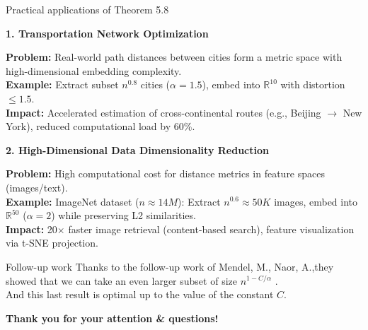 \documentclass[xcolor=dvipsnames]{beamer}
\theoremstyle{remark}
\def \cbf {\color{blue}\bf}
\begin{document}
   \begin{frame}{Practical applications of Theorem 5.8}
    \vspace{-0.2cm}
    
    \textbf{\large 1. Transportation Network Optimization}  
    \vspace{0.1cm}
    
    \textbf{Problem:} Real-world path distances between cities form a metric space with high-dimensional embedding complexity.\\
    \textbf{Example:} Extract subset \( n^{0.8} \) cities (\( \alpha=1.5 \)), embed into \( \mathbb{R}^{10} \) with distortion \( \leq 1.5 \).\\
    \textbf{Impact:} Accelerated estimation of cross-continental routes (e.g., Beijing \(\to\) New York), reduced computational load by 60\%.\\
    
    \vspace{0.3cm}
    
    \textbf{\large 2. High-Dimensional Data Dimensionality Reduction}  
    \vspace{0.1cm}
    
    \textbf{Problem:} High computational cost for distance metrics in feature spaces (images/text).\\
    \textbf{Example:} ImageNet dataset (\( n \approx 14M \)): Extract \( n^{0.6} \approx 50K \) images, embed into \( \mathbb{R}^{50} \) (\( \alpha=2 \)) while preserving L2 similarities.\\
    \textbf{Impact:} 20\(\times\) faster image retrieval (content-based search), feature visualization via t-SNE projection.\\
    

  \end{frame}
  \begin{frame}{Follow-up work}
    \hspace*{1em}Thanks to the follow-up work of Mendel, M., Naor, A.,they showed that we can take an even
larger subset of size \( n^{1 - C/\alpha} \) .\\ \hspace*{1em}And this last result is optimal up to the value of the constant $C$.
  \end{frame}

  
\begin{frame}
 
    {\Large \cbf Thank you for your attention \& questions! }
   
\end{frame}
   
\end{document}
